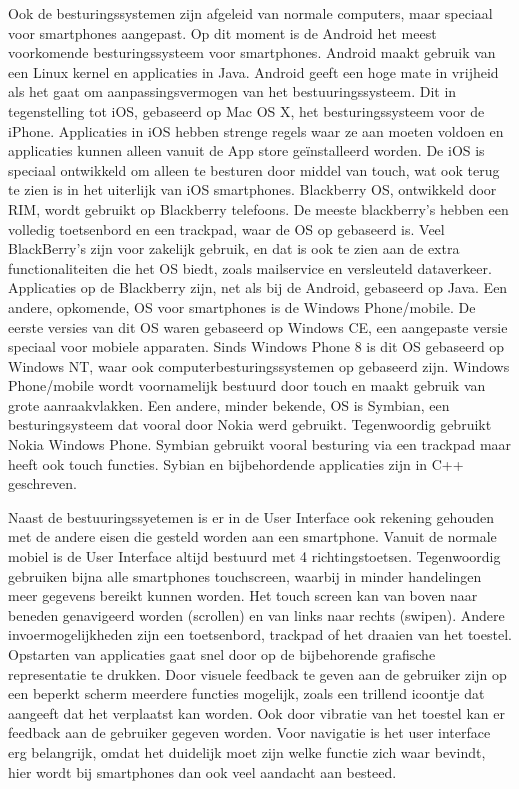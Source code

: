 Ook de besturingssystemen zijn afgeleid van normale computers, maar speciaal voor smartphones aangepast. Op dit moment is de Android het meest voorkomende besturingssysteem voor smartphones. Android maakt gebruik van een Linux kernel en applicaties in Java. Android geeft een hoge mate in vrijheid als het gaat om aanpassingsvermogen van het bestuuringssysteem. Dit in tegenstelling tot iOS, gebaseerd op Mac OS X, het besturingssysteem voor de iPhone. Applicaties in iOS hebben strenge regels waar ze aan moeten voldoen en applicaties kunnen alleen vanuit de App store geïnstalleerd worden. De iOS is speciaal ontwikkeld om alleen te besturen door middel van touch, wat ook terug te zien is in het uiterlijk van iOS smartphones. Blackberry OS, ontwikkeld door RIM, wordt gebruikt op Blackberry telefoons. De meeste blackberry’s hebben een volledig toetsenbord en een trackpad, waar de OS op gebaseerd is. Veel BlackBerry’s zijn voor zakelijk gebruik, en dat is ook te zien aan de extra functionaliteiten die het OS biedt, zoals mailservice en versleuteld dataverkeer. Applicaties op de Blackberry zijn, net als bij de Android, gebaseerd op Java. Een andere, opkomende, OS voor smartphones is de Windows Phone/mobile. De eerste versies van dit OS waren gebaseerd op Windows CE, een aangepaste versie speciaal voor mobiele apparaten. Sinds Windows Phone 8 is dit OS gebaseerd op Windows NT, waar ook computerbesturingssystemen op gebaseerd zijn. Windows Phone/mobile wordt voornamelijk bestuurd door touch en maakt gebruik van grote aanraakvlakken. Een andere, minder bekende, OS is Symbian, een besturingsysteem dat vooral door Nokia werd gebruikt. Tegenwoordig gebruikt Nokia Windows Phone. Symbian gebruikt vooral besturing via een trackpad maar heeft ook touch functies. Sybian en bijbehordende applicaties zijn in C++ geschreven.

Naast de bestuuringssyetemen is er in de User Interface ook rekening gehouden met de andere eisen die gesteld worden aan een smartphone. Vanuit de normale mobiel is de User Interface altijd bestuurd met 4 richtingstoetsen. Tegenwoordig gebruiken bijna alle smartphones touchscreen, waarbij in minder handelingen meer gegevens bereikt kunnen worden. Het touch screen kan van boven naar beneden genavigeerd worden (scrollen) en van links naar rechts (swipen). Andere invoermogelijkheden zijn een toetsenbord, trackpad of het draaien van het toestel. Opstarten van applicaties gaat snel door op de bijbehorende grafische representatie te drukken. Door visuele feedback te geven aan de gebruiker zijn op een beperkt scherm meerdere functies mogelijk, zoals een trillend icoontje dat aangeeft dat het verplaatst kan worden. Ook door vibratie van het toestel kan er feedback aan de gebruiker gegeven worden. Voor navigatie is het user interface erg belangrijk, omdat het duidelijk moet zijn welke functie zich waar bevindt, hier wordt bij smartphones dan ook veel aandacht aan besteed. 

